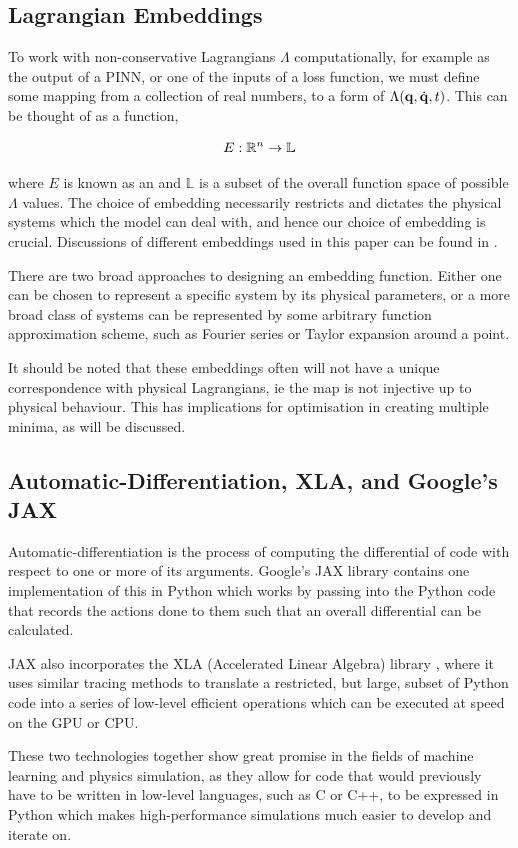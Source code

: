 \subsection{Lagrangian Embeddings}

To work with non-conservative Lagrangians $\Lambda$ computationally, for example as the output of a PINN, or one of the inputs of a loss function, we must define some mapping from a collection of real numbers, to a form of $\Lambda(\vb{q}, \dot{\vb{q}}, t)$. This can be thought of as a function,

\begin{equation}
  E: \mathbb{R}^n \to \mathbb{L}
\end{equation}

where $E$ is known as an  and $\mathbb{L}$ is a subset of the overall function space of possible $\Lambda$ values. 
The choice of embedding necessarily restricts and dictates the physical systems which the model can deal with, and hence our choice of embedding is crucial. Discussions of different embeddings used in this paper can be found in .

There are two broad approaches to designing an embedding function. Either one can be chosen to represent a specific system by its physical parameters, or a more broad class of systems can be represented by some arbitrary function approximation scheme, such as Fourier series or Taylor expansion around a point.

It should be noted that these embeddings often will not have a unique correspondence with physical Lagrangians, ie the map is not injective up to physical behaviour. This has implications for optimisation in creating multiple minima, as will be discussed.

\subsection{Automatic-Differentiation, XLA, and Google's JAX}
\label{sec:intro-autodiff}

Automatic-differentiation is the process of computing the differential of  code with respect to one or more of its arguments. Google's JAX library \cite{jax2018github} contains one implementation of this in Python which works by passing  into the Python code that records the actions done to them such that an overall differential can be calculated.

JAX also incorporates the XLA (Accelerated Linear Algebra) library \cite{openxla-xla}, where it uses similar tracing methods to translate a restricted, but large, subset of Python code into a series of low-level efficient operations which can be executed at speed on the GPU or CPU.

These two technologies together show great promise in the fields of machine learning and physics simulation, as they allow for code that would previously have to be written in low-level languages, such as C or C++, to be expressed in Python which makes high-performance simulations much easier to develop and iterate on.
